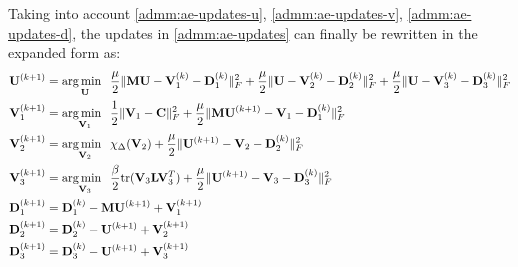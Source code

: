 Taking into account \eqref{admm:ae-updates-u}, \eqref{admm:ae-updates-v}, \eqref{admm:ae-updates-d}, the updates in \eqref{admm:ae-updates} can finally be rewritten in the expanded form as:
\begin{equation}
  \label{admm:ae-updates-final}
  \begin{aligned}
    \mathbf{U}^{(k+1)} & = \operatorname*{arg\,min \;\;}_{\mathbf{U}}  
    \frac{\mu}{2} \|\mathbf{MU} - \mathbf{V}_1^{(k)} - \mathbf{D}_1^{(k)}\|_F^2  + \frac{\mu}{2} \|\mathbf{U} - \mathbf{V}_2^{(k)} - \mathbf{D}_2^{(k)}\|_F^2  + \frac{\mu}{2} \|\mathbf{U} - \mathbf{V}_3^{(k)} - \mathbf{D}_3^{(k)}\|_F^2 
    \\
    \mathbf{V}_1^{(k+1)} &= \operatorname*{arg\,min \;\;}_{\mathbf{V}_1} \frac{1}{2} \|\mathbf{V}_1 - \mathbf{C} \|_F^2 + \frac{\mu}{2} \|\mathbf{MU}^{(k+1)} - \mathbf{V}_1 - \mathbf{D}_1^{(k)}\|_F^2 \\
    \mathbf{V}_2^{(k+1)} &= \operatorname*{arg\,min \;\;}_{\mathbf{V}_2} \chi_{\Delta}(\mathbf{V}_2) + \frac{\mu}{2} \|\mathbf{U}^{(k+1)} - \mathbf{V}_2 - \mathbf{D}_2^{(k)}\|_F^2 \\
    \mathbf{V}_3^{(k+1)} &= \operatorname*{arg\,min \;\;}_{\mathbf{V}_3} \frac{\beta}{2}\text{tr}(\mathbf{V}_3\mathbf{L}\mathbf{V}_3^T) + \frac{\mu}{2} \|\mathbf{U}^{(k+1)} - \mathbf{V}_3 - \mathbf{D}_3^{(k)}\|_F^2 \\
    \mathbf{D}_1^{(k+1)} &= \mathbf{D}_1^{(k)} - \mathbf{MU}^{(k+1)} + \mathbf{V}_1^{(k+1)} \\
    \mathbf{D}_2^{(k+1)} &= \mathbf{D}_2^{(k)} - \mathbf{U}^{(k+1)} + \mathbf{V}_2^{(k+1)} \\
    \mathbf{D}_3^{(k+1)} &= \mathbf{D}_3^{(k)} - \mathbf{U}^{(k+1)} + \mathbf{V}_3^{(k+1)} 
  \end{aligned}
\end{equation}

